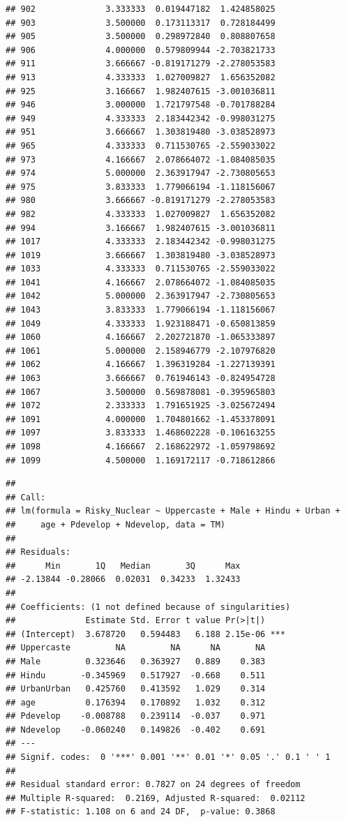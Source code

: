 \documentclass[
]{article}
\begin{document}
\begin{verbatim}
## 902              3.333333  0.019447182  1.424858025
## 903              3.500000  0.173113317  0.728184499
## 905              3.500000  0.298972840  0.808807658
## 906              4.000000  0.579809944 -2.703821733
## 911              3.666667 -0.819171279 -2.278053583
## 913              4.333333  1.027009827  1.656352082
## 925              3.166667  1.982407615 -3.001036811
## 946              3.000000  1.721797548 -0.701788284
## 949              4.333333  2.183442342 -0.998031275
## 951              3.666667  1.303819480 -3.038528973
## 965              4.333333  0.711530765 -2.559033022
## 973              4.166667  2.078664072 -1.084085035
## 974              5.000000  2.363917947 -2.730805653
## 975              3.833333  1.779066194 -1.118156067
## 980              3.666667 -0.819171279 -2.278053583
## 982              4.333333  1.027009827  1.656352082
## 994              3.166667  1.982407615 -3.001036811
## 1017             4.333333  2.183442342 -0.998031275
## 1019             3.666667  1.303819480 -3.038528973
## 1033             4.333333  0.711530765 -2.559033022
## 1041             4.166667  2.078664072 -1.084085035
## 1042             5.000000  2.363917947 -2.730805653
## 1043             3.833333  1.779066194 -1.118156067
## 1049             4.333333  1.923188471 -0.650813859
## 1060             4.166667  2.202721870 -1.065333897
## 1061             5.000000  2.158946779 -2.107976820
## 1062             4.166667  1.396319284 -1.227139391
## 1063             3.666667  0.761946143 -0.824954728
## 1067             3.500000  0.569878081 -0.395965803
## 1072             2.333333  1.791651925 -3.025672494
## 1091             4.000000  1.704801662 -1.453378091
## 1097             3.833333  1.468602228 -0.106163255
## 1098             4.166667  2.168622972 -1.059798692
## 1099             4.500000  1.169172117 -0.718612866
\end{verbatim}

\begin{verbatim}
## 
## Call:
## lm(formula = Risky_Nuclear ~ Uppercaste + Male + Hindu + Urban + 
##     age + Pdevelop + Ndevelop, data = TM)
## 
## Residuals:
##      Min       1Q   Median       3Q      Max 
## -2.13844 -0.28066  0.02031  0.34233  1.32433 
## 
## Coefficients: (1 not defined because of singularities)
##              Estimate Std. Error t value Pr(>|t|)    
## (Intercept)  3.678720   0.594483   6.188 2.15e-06 ***
## Uppercaste         NA         NA      NA       NA    
## Male         0.323646   0.363927   0.889    0.383    
## Hindu       -0.345969   0.517927  -0.668    0.511    
## UrbanUrban   0.425760   0.413592   1.029    0.314    
## age          0.176394   0.170892   1.032    0.312    
## Pdevelop    -0.008788   0.239114  -0.037    0.971    
## Ndevelop    -0.060240   0.149826  -0.402    0.691    
## ---
## Signif. codes:  0 '***' 0.001 '**' 0.01 '*' 0.05 '.' 0.1 ' ' 1
## 
## Residual standard error: 0.7827 on 24 degrees of freedom
## Multiple R-squared:  0.2169, Adjusted R-squared:  0.02112 
## F-statistic: 1.108 on 6 and 24 DF,  p-value: 0.3868
\end{verbatim}
\end{document}
